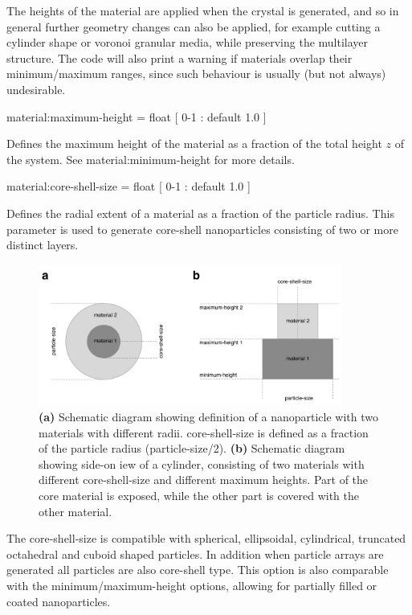 The heights of the material are applied when the crystal is generated, and so
in general further geometry changes can also be applied, for example cutting a
cylinder shape or voronoi granular media, while preserving the multilayer
structure. The code will also print a warning if materials overlap their
minimum/maximum ranges, since such behaviour is usually (but not always)
undesirable.

{\zicf material:maximum-height = float [ 0-1 : default 1.0 ]}
Defines the maximum height of the material as a fraction of the total height
$z$ of the system. See material:minimum-height for more details.

{\zicf material:core-shell-size = float [ 0-1 : default 1.0 ]}
Defines the radial extent of a material as a fraction of the particle radius.
This parameter is used to generate core-shell nanoparticles consisting of two
or more distinct layers.

\begin{figure}[!htb]
\center
\includegraphics[width=10cm]{figures/core-shell.pdf}
\caption{\textbf{(a)} Schematic diagram showing definition of a nanoparticle
with two materials with different radii. core-shell-size is defined as a
fraction of the particle radius (particle-size/2). \textbf{(b)} Schematic
diagram showing side-on iew of a cylinder, consisting of two materials with
different core-shell-size and different maximum heights. Part of the core
material is exposed, while the other part is covered with the other material.}
\label{fig:core-shell}
\end{figure}

The core-shell-size is compatible with spherical, ellipsoidal, cylindrical,
truncated octahedral and cuboid shaped particles. In addition when particle
arrays are generated all particles are also core-shell type. This option is
also comparable with the minimum/maximum-height options, allowing for partially
filled or coated nanoparticles.


